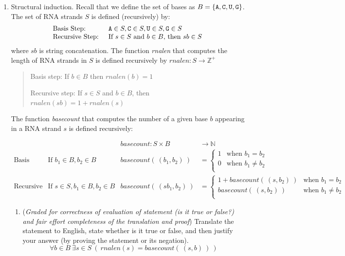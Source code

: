 \begin{enumerate}[labelindent=0pt, leftmargin=0pt]
\begin{enumerate}
    \end{enumerate}
    
    \item Structural induction. Recall that we define the set of bases as $B  =  \{ \texttt{A}, \texttt{C}, \texttt{U}, \texttt{G} \}$.
The set of RNA strands $S$ is defined (recursively) by:
\[
\begin{array}{ll}
\textrm{Basis Step: } & \texttt{A} \in S, \texttt{C} \in S, \texttt{U} \in S, \texttt{G} \in S \\
\textrm{Recursive Step: } & \textrm{If } s \in S\textrm{ and }b \in B \textrm{, then }sb \in S
\end{array}
\]
where $sb$ is string concatenation. 
The function \textit{rnalen} that computes the length of RNA strands in $S$ is defined recursively by
$rnalen: S  \to \mathbb{Z}^+$


\begin{quote}
Basis step: If $b \in B$ then $rnalen(b)  = 1$

Recursive step: If $s \in S$ and $b \in B$, then $rnalen(sb)  = 1 + rnalen(s)$
\end{quote}

The function \textit{basecount} that computes the number of a given base 
$b$ appearing in a RNA strand $s$ is defined recursively:
    
\[
\begin{array}{llll}
& & \textit{basecount} : S \times B & \to \mathbb{N} \\
\textrm{Basis Step:} &  \textrm{If } b_1 \in B, b_2 \in B & \textit{basecount}(~(b_1, b_2)~) & =
        \begin{cases}
            1 & \textrm{when } b_1 = b_2 \\
            0 & \textrm{when } b_1 \neq b_2 \\
        \end{cases} \\
\textrm{Recursive Step:} & \textrm{If } s \in S, b_1 \in B, b_2 \in B &\textit{basecount}(~(s b_1, b_2)~) & =
        \begin{cases}
            1 + \textit{basecount}(~(s, b_2)~) & \textrm{when } b_1 = b_2 \\
            \textit{basecount}(~(s, b_2)~) & \textrm{when } b_1 \neq b_2 \\
        \end{cases}
\end{array}
\]
\begin{enumerate}
\item ({\it Graded for correctness of evaluation of statement (is it true or false?) and fair effort completeness of the translation and proof}) 
Translate the statement to English, state whether is it true or false, and then justify your answer (by proving the statement or its negation).
$$\forall b \in B ~\exists s \in S ~(~rnalen(s) = basecount(~(s,b)~)~)$$


\end{enumerate}
\end{enumerate}
